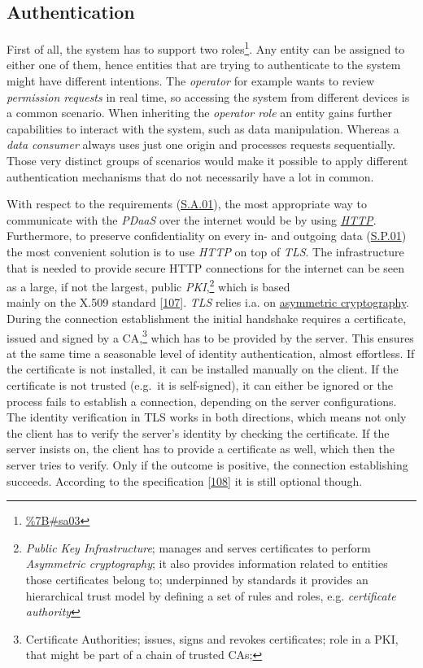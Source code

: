 \documentclass[12pt,english,a4paper,titlepage,cleardoublepage=empty,dottedtoc]{report}
\renewcommand{\href}[2]{#2\footnote{\url{#1}}}
\begin{document}
\subsection{Authentication}\label{authentication}

First of all, the system has to support two \href{\%7B\#sa03}{roles}.
Any entity can be assigned to either one of them, hence entities that
are trying to authenticate to the system might have different
intentions. The \emph{operator} for example wants to review
\emph{permission requests} in real time, so accessing the system from
different devices is a common scenario. When inheriting the
\emph{operator role} an entity gains further capabilities to interact
with the system, such as data manipulation. Whereas a \emph{data
consumer} always uses just one origin and processes requests
sequentially. Those very distinct groups of scenarios would make it
possible to apply different authentication mechanisms that do not
necessarily have a lot in common.

With respect to the requirements (\protect\hyperlink{sa01}{S.A.01}), the
most appropriate way to communicate with the \emph{PDaaS} over the
internet would be by using \emph{\protect\hyperlink{link_http}{HTTP}}.
Furthermore, to preserve confidentiality on every in- and outgoing data
(\protect\hyperlink{sp01}{S.P.01}) the most convenient solution is to
use \emph{HTTP} on top of \emph{TLS}. The infrastructure that is needed
to provide secure HTTP connections for the internet can be seen as a
large, if not the largest, public \emph{PKI},\footnote{\emph{Public Key
  Infrastructure}; manages and serves certificates to perform
  \emph{Asymmetric cryptography}; it also provides information related
  to entities those certificates belong to; underpinned by standards it
  provides an hierarchical trust model by defining a set of rules and
  roles, e.g. \emph{certificate authority}} which is based\\
mainly on the X.509 standard
{[}\protect\hyperlink{ref-web_spec_x509}{107}{]}. \emph{TLS} relies i.a.
on \protect\hyperlink{link_asym-crypto}{asymmetric cryptography}. During
the connection establishment the initial handshake requires a
certificate, issued and signed by a CA,\footnote{Certificate
  Authorities; issues, signs and revokes certificates; role in a PKI,
  that might be part of a chain of trusted CAs;} which has to be
provided by the server. This ensures at the same time a seasonable level
of identity authentication, almost effortless. If the certificate is not
installed, it can be installed manually on the client. If the
certificate is not trusted (e.g.~it is self-signed), it can either be
ignored or the process fails to establish a connection, depending on the
server configurations. The identity verification in TLS works in both
directions, which means not only the client has to verify the server's
identity by checking the certificate. If the server insists on, the
client has to provide a certificate as well, which then the server tries
to verify. Only if the outcome is positive, the connection establishing
succeeds. According to the specification
{[}\protect\hyperlink{ref-web_spec_tls-12_client-auth}{108}{]} it is
still optional though.
\end{document}
